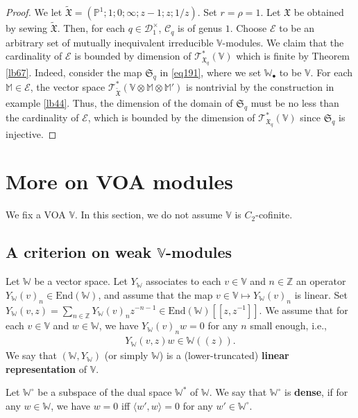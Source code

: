 \documentclass[12pt,a4paper,notitlepage]{report}
\theoremstyle{definition}
\theoremstyle{plain}
\newcommand{\fk}{\mathfrak}
\newcommand{\mc}{\mathcal}
\newcommand{\wtd}{\widetilde}
\newcommand{\End}{\mathrm{End}} %
\newcommand{\bk}[1]{\langle {#1}\rangle}
\newcommand{\scr}{\mathscr}
\newcommand{\blt}{\bullet}
\newcommand{\Vbb}{\mathbb V}
\newcommand{\Wbb}{\mathbb W}
\newcommand{\Mbb}{\mathbb M}
\newcommand{\Zbb}{\mathbb Z}
\newcommand{\Pbb}{\mathbb P}
\numberwithin{equation}{section}
\begin{document}
\begin{proof}
We let $\wtd{\fk X}=(\Pbb^1;1;0;\infty;z-1;z;1/z)$. Set $r=\rho=1$. Let $\fk X$ be obtained by sewing $\wtd{\fk X}$. Then, for each $q\in\mc D_1^\times$, $\mc C_q$ is of genus $1$. Choose $\mc E$ to be an arbitrary set of mutually inequivalent irreducible $\Vbb$-modules. We claim that the cardinality of $\mc E$ is bounded by dimension of $\scr T_{\fk X_q}^*(\Vbb)$ which is finite by Theorem \ref{lb67}. Indeed, consider the map $\fk S_q$ in \eqref{eq191}, where we set $\Wbb_\blt$ to be $\Vbb$. For each $\Mbb\in\mc E$, the vector space $\scr T_{\wtd {\fk X}}^*(\Vbb\otimes\Mbb\otimes\Mbb')$ is nontrivial by the construction in example \ref{lb44}. Thus, the dimension of the domain of $\fk S_q$ must be no less than the cardinality of $\mc E$, which is bounded by the dimension of $\scr T_{\fk X_q}^*(\Vbb)$ since $\fk S_q$ is injective.
\end{proof}





\section{More on VOA modules}

We fix a  VOA $\Vbb$. In this section, we do not assume $\Vbb$ is $C_2$-cofinite.

\subsection*{A criterion on weak $\Vbb$-modules}



Let $\Wbb$ be a vector space. Let $Y_\Wbb$ associates to each $v\in\Vbb$ and $n\in\Zbb$ an operator $Y_\Wbb(v)_n\in\End(\Wbb)$, and assume that the map $v\in\Vbb\mapsto Y_\Wbb(v)_n$ is linear. Set $Y_\Wbb(v,z)=\sum_{n\in\Zbb}Y_\Wbb(v)_nz^{-n-1}\in \End(\Wbb)[[z,z^{-1}]]$. We assume that for each $v\in\Vbb$ and $w\in\Wbb$, we have $Y_\Wbb(v)_nw=0$ for any $n$ small enough, i.e.,
\begin{align*}
Y_\Wbb(v,z)w\in\Wbb((z)).
\end{align*}
We say that $(\Wbb,Y_\Wbb)$ (or simply $\Wbb$) is a (lower-truncated) \textbf{linear representation} of $\Vbb$. 

Let $\Wbb^\circ$ be a subspace of the dual space $\Wbb^*$ of $\Wbb$. We say that $\Wbb^\circ$ is \textbf{dense}, if for any $w\in\Wbb$, we have $w=0$ iff $\bk{w',w}=0$ for any $w'\in\Wbb^\circ$. 
\end{document}
